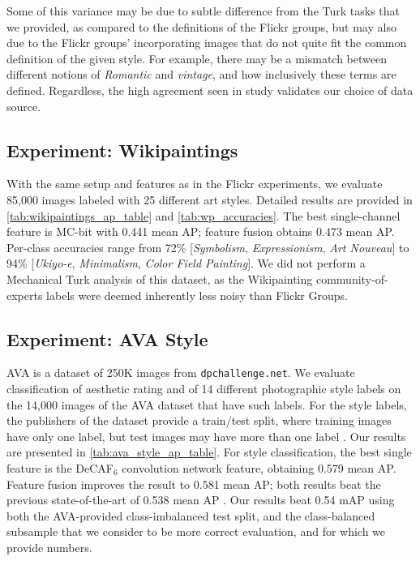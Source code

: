 Some of this variance may be due to subtle difference from the Turk tasks that we provided, as compared to the definitions of the Flickr groups, but may also due to the Flickr groups' incorporating images that do not quite fit the common definition of the given style.
For example, there may be a mismatch between different notions of \emph{Romantic} and \emph{vintage}, and how inclusively these terms are defined.
Regardless, the high agreement seen in study validates our choice of data source.

\subsection{Experiment: Wikipaintings}

With the same setup and features as in the Flickr experiments, we evaluate 85,000 images labeled with 25 different art styles.
Detailed results are provided in \autoref{tab:wikipaintings_ap_table} and \autoref{tab:wp_accuracies}.
The best single-channel feature is MC-bit with 0.441 mean AP; feature fusion obtains 0.473 mean AP.
Per-class accuracies range from 72\% [\emph{Symbolism}, \emph{Expressionism}, \emph{Art Nouveau}] to 94\% [\emph{Ukiyo-e}, \emph{Minimalism}, \emph{Color Field Painting}].
We did not perform a Mechanical Turk analysis of this dataset, as the Wikipainting community-of-experts labels were deemed inherently less noisy than Flickr Groups.

\subsection{Experiment: AVA Style}

AVA \parencite{Murray-CVPR-2012} is a dataset of 250K images from \texttt{dpchallenge.net}.
We evaluate classification of aesthetic rating and of 14 different photographic style labels on the 14,000 images of the AVA dataset that have such labels.
For the style labels, the publishers of the dataset provide a train/test split, where training images have only one label, but test images may have more than one label \parencite{Murray-CVPR-2012}.
Our results are presented in \autoref{tab:ava_style_ap_table}.
For style classification, the best single feature is the DeCAF$_6$ convolution network feature, obtaining 0.579 mean AP.
Feature fusion improves the result to 0.581 mean AP; both results beat the previous state-of-the-art of 0.538 mean AP \parencite{Murray-CVPR-2012}.
Our results beat 0.54 mAP using both the AVA-provided class-imbalanced test split, and the class-balanced subsample that we consider to be more correct evaluation, and for which we provide numbers.

